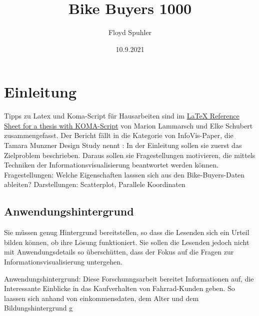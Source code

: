 \documentclass[usegeometry=true]{scrartcl}
\begin{document}
\subject{Projektbericht zum Modul Information Retrieval und Visualisierung Sommersemester 2021}
\title{Bike Buyers 1000}
\author{Floyd Spuhler}%
\date{10.9.2021}
\maketitle%

\section{Einleitung}
Tipps zu Latex und Koma-Script für Hausarbeiten sind im \href{http://mirrors.ctan.org/info/latex-refsheet/LaTeX_RefSheet.pdf}{LaTeX Reference Sheet for a thesis with KOMA-Script} von Marion Lammarsch und Elke Schubert zusammengefasst. 
Der Bericht fällt in die Kategorie von InfoVis-Paper, die Tamara Munzner Design Study nennt \cite{Munzner2008}: In der Einleitung sollen sie zuerst das Zielproblem beschrieben. Daraus sollen sie Fragestellungen motivieren, die mittels Techniken der Informationsvisualisierung beantwortet werden können. \newline
\newline Fragestellungen: Welche Eigenschaften lasssen sich aus den Bike-Buyers-Daten ableiten? Darstellungen: Scatterplot, Parallele Koordinaten

\subsection{Anwendungshintergrund}
Sie müssen genug Hintergrund bereitstellen, so dass die Lesenden sich ein Urteil bilden können, ob ihre Lösung funktioniert. Sie sollen die Lesenden jedoch nicht mit Anwendungsdetails so überschütten, dass der Fokus auf die Fragen zur Informationsvisualisierung untergehen. 

Anwendungshintergrund: Diese Forschunngsarbeit bereitet Informationen auf, die Interessante Einblicke in das Kaufverhalten von Fahrrad-Kunden geben. So laassen sich anhand von einkommensdaten, dem Alter und dem Bildungshintergrund g 
\end{document}
